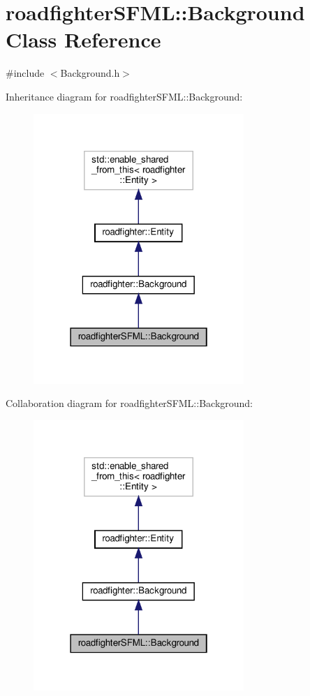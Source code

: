 \hypertarget{classroadfighterSFML_1_1Background}{}\section{roadfighter\+S\+F\+ML\+:\+:Background Class Reference}
\label{classroadfighterSFML_1_1Background}


{\ttfamily \#include $<$Background.\+h$>$}



Inheritance diagram for roadfighter\+S\+F\+ML\+:\+:Background\+:\nopagebreak
\begin{figure}[H]
\begin{center}
\leavevmode
\includegraphics[width=226pt]{classroadfighterSFML_1_1Background__inherit__graph}
\end{center}
\end{figure}


Collaboration diagram for roadfighter\+S\+F\+ML\+:\+:Background\+:\nopagebreak
\begin{figure}[H]
\begin{center}
\leavevmode
\includegraphics[width=226pt]{classroadfighterSFML_1_1Background__coll__graph}
\end{center}
\end{figure}
